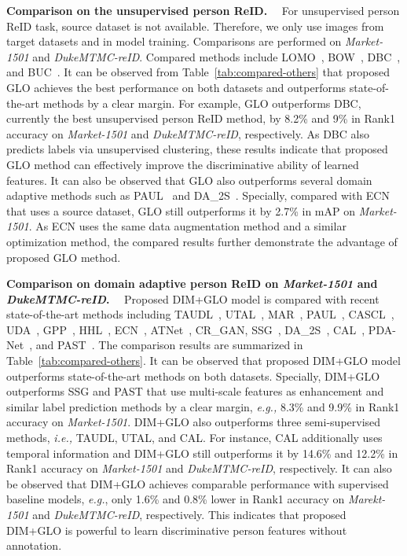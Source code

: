\documentclass[sigconf]{acmart}
\begin{document}
\textbf{Comparison on the unsupervised person ReID.} \ \
For unsupervised person ReID task, source dataset is not available. Therefore, we only use images from target datasets and  in model training. Comparisons are performed on \textit{Market-1501} and \textit{DukeMTMC-reID}. Compared methods include LOMO~\cite{lomo}, BOW~\cite{market}, DBC~\cite{ding2019towards}, and BUC~\cite{lin2019bottom}. It can be observed from Table~\ref{tab:compared-others} that proposed GLO achieves the best performance on both datasets and outperforms state-of-the-art methods by a clear margin. For example, GLO outperforms DBC, currently the best unsupervised person ReID method, by 8.2\% and 9\% in Rank1 accuracy on \textit{Market-1501} and \textit{DukeMTMC-reID}, respectively. As DBC also predicts labels via unsupervised clustering, these results indicate that proposed GLO method can effectively improve the discriminative ability of learned features. It can also be observed that GLO also outperforms several domain adaptive methods such as  PAUL~\cite{yang2019patch} and DA\_2S~\cite{huang2019sbsgan}. Specially, compared with ECN~\cite{zhong2019invariance} that uses a source dataset, GLO still outperforms it by 2.7\% in mAP on \textit{Market-1501}. As ECN uses the same data augmentation method and a similar optimization method, the compared results further demonstrate the advantage of proposed GLO method. 

\textbf{Comparison on domain adaptive person ReID on \textit{Market-1501} and \textit{DukeMTMC-reID}.} \ \ 
Proposed DIM+GLO model is compared with recent state-of-the-art methods including TAUDL~\cite{li2018unsupervised}, UTAL~\cite{li2019unsupervised-pami}, MAR~\cite{yu2019unsupervised}, PAUL~\cite{yang2019patch}, CASCL~\cite{wu2019unsupervised}, UDA~\cite{adaptive-reid}, GPP~\cite{zhong2019learning}, HHL~\cite{zhong2018generalizing}, ECN~\cite{zhong2019invariance}, ATNet~\cite{Liu_2019_CVPR}, CR\_GAN\cite{Chen_2019_ICCV}, SSG~\cite{ssg}, DA\_2S~\cite{huang2019sbsgan}, CAL~\cite{Qi_2019_ICCV}, PDA-Net~\cite{Li_2019_ICCV}, and PAST~\cite{Zhang_2019_ICCV}. The comparison results are summarized in Table~\ref{tab:compared-others}. It can be observed that proposed DIM+GLO model outperforms state-of-the-art methods on both datasets. Specially, DIM+GLO outperforms SSG and PAST that use multi-scale features as enhancement and similar label prediction methods by a clear margin, \textit{e.g.,} 8.3\% and 9.9\% in Rank1 accuracy on \textit{Market-1501}. DIM+GLO also outperforms three semi-supervised methods, \textit{i.e.,} TAUDL, UTAL, and CAL. For instance, CAL additionally uses temporal information and DIM+GLO still outperforms it by 14.6\% and 12.2\% in Rank1 accuracy on \textit{Market-1501} and \textit{DukeMTMC-reID}, respectively. It can also be observed that DIM+GLO achieves comparable performance with supervised baseline models, \textit{e.g.}, only 1.6\% and 0.8\% lower in Rank1 accuracy on \textit{Marekt-1501} and \textit{DukeMTMC-reID}, respectively. This indicates that proposed DIM+GLO is powerful to learn discriminative person features without annotation.
\end{document}
